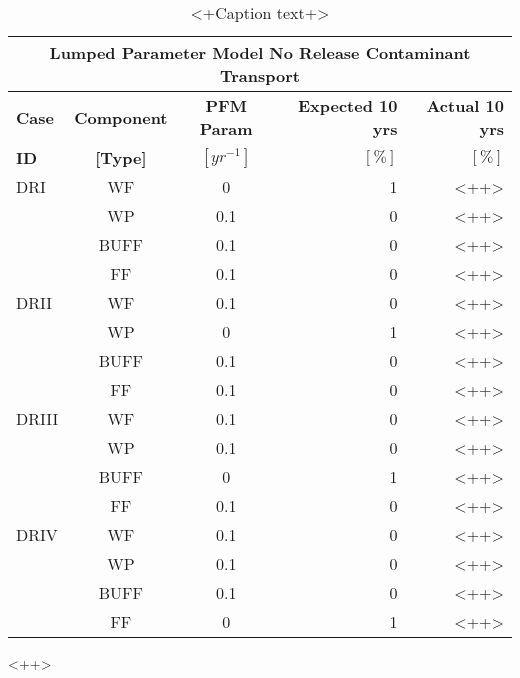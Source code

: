 \begin{table}
\centering
\begin{tabularx}{\textwidth}{|X|c|c|r|r|}
  \hline
  \multicolumn{5}{c}{\textbf{Lumped Parameter Model No Release Contaminant Transport}} \\
  \hline
  \textbf{Case}  &  \textbf{Component} &  \textbf{PFM Param} & \textbf{Expected 10 yrs} & \textbf{Actual 10 yrs} \\
  \textbf{ID}    & \textbf{[Type]} &  \textbf{$[yr^{-1}]$}  &  $[\%]$  & $[\%]$ \\
  \hline
  DRI     &  WF    &  0   & 1 & <++> \\
          &  WP    &  0.1 & 0 & <++> \\
          &  BUFF  &  0.1 & 0 & <++> \\
          &  FF    &  0.1 & 0 & <++> \\
  \hline
  DRII    &  WF    &  0.1 & 0 & <++> \\
          &  WP    &  0   & 1 & <++> \\
          &  BUFF  &  0.1 & 0 & <++> \\
          &  FF    &  0.1 & 0 & <++> \\
  \hline
  DRIII   &  WF    &  0.1 & 0 & <++> \\
          &  WP    &  0.1 & 0 & <++> \\
          &  BUFF  &  0   & 1 & <++> \\
          &  FF    &  0.1 & 0 & <++> \\
  \hline
  DRIV    &  WF    &  0.1 & 0 & <++> \\
          &  WP    &  0.1 & 0 & <++> \\
          &  BUFF  &  0.1 & 0 & <++> \\
          &  FF    &  0   & 1 & <++> \\
  \hline
\end{tabularx}
\caption{<+Caption text+>}
\label{tab:<+label+>}
\end{table}<++>
